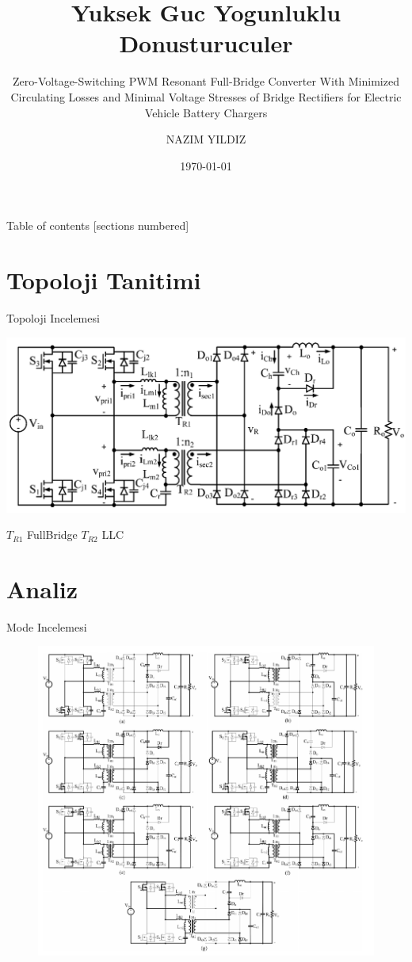 \documentclass[10pt]{beamer}
\title{Yuksek Guc Yogunluklu Donusturuculer}
\subtitle{Zero-Voltage-Switching PWM Resonant Full-Bridge
	Converter With Minimized Circulating Losses and
	Minimal Voltage Stresses of Bridge Rectifiers for
	Electric Vehicle Battery Chargers
	}
\date{\today}
\author{NAZIM YILDIZ}
\institute{Elektrik-Elektronik}
\begin{document}
\maketitle

\begin{frame}{Table of contents}
  [sections numbered]
  \tableofcontents[hideallsubsections]
\end{frame}

\section{Topoloji Tanitimi}

\begin{frame}[fragile]{Topoloji Incelemesi}

   \includegraphics[scale=0.3]{sema.png}

  $T_{R1}$ FullBridge\newline
  $T_{R2}$ LLC

\end{frame}


\section{Analiz}
\begin{frame}{Mode Incelemesi}
	\begin{figure}
		\centering
		\includegraphics[scale=0.25]{modes.png}
	\end{figure}

\end{frame}
\end{document}
